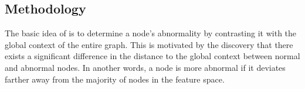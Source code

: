 \subsection{Methodology}
\label{subsec:overview}





The basic idea of \smodel is to determine a node's abnormality by contrasting it with the global context of the entire graph. 
This is motivated by the discovery that there exists a significant difference in the distance to the global context between normal and abnormal nodes. In another words, a node is more abnormal if it deviates farther away from the majority of nodes in the feature space. 


